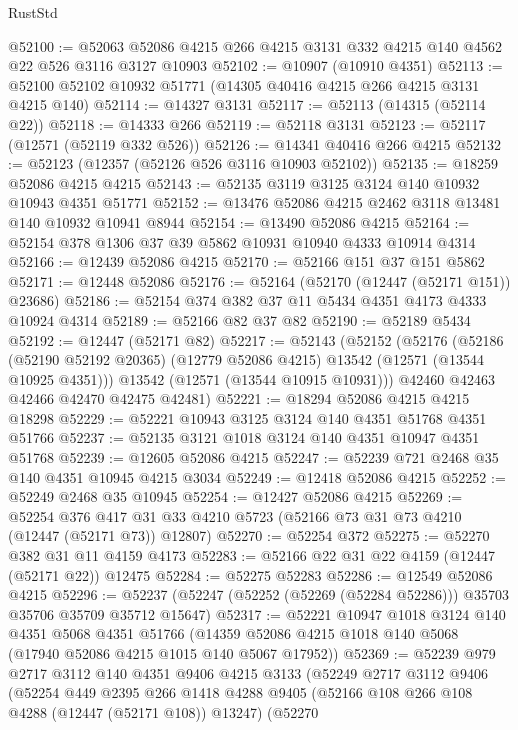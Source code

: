 \begin{lexlean}{RustStd}
\begin{coremodule}
@52100 := @52063 @52086 @4215 @266 @4215 @3131 @332 @4215 @140 @4562 @22 @526 @3116 @3127 @10903
@52102 := @10907 (@10910 @4351)
@52113 := @52100 @52102 @10932 @51771 (@14305 @40416 @4215 @266 @4215 @3131 @4215 @140)
@52114 := @14327 @3131
@52117 := @52113 (@14315 (@52114 @22))
@52118 := @14333 @266
@52119 := @52118 @3131
@52123 := @52117 (@12571 (@52119 @332 @526))
@52126 := @14341 @40416 @266 @4215
@52132 := @52123 (@12357 (@52126 @526 @3116 @10903 @52102))
@52135 := @18259 @52086 @4215 @4215
@52143 := @52135 @3119 @3125 @3124 @140 @10932 @10943 @4351 @51771
@52152 := @13476 @52086 @4215 @2462 @3118 @13481 @140 @10932 @10941 @8944
@52154 := @13490 @52086 @4215
@52164 := @52154 @378 @1306 @37 @39 @5862 @10931 @10940 @4333 @10914 @4314
@52166 := @12439 @52086 @4215
@52170 := @52166 @151 @37 @151 @5862
@52171 := @12448 @52086
@52176 := @52164 (@52170 (@12447 (@52171 @151)) @23686)
@52186 := @52154 @374 @382 @37 @11 @5434 @4351 @4173 @4333 @10924 @4314
@52189 := @52166 @82 @37 @82
@52190 := @52189 @5434
@52192 := @12447 (@52171 @82)
@52217 := @52143
    (@52152
      (@52176
        (@52186 (@52190 @52192 @20365) (@12779 @52086 @4215) @13542 (@12571 (@13544 @10925 @4351)))
        @13542
        (@12571 (@13544 @10915 @10931)))
      @42460
      @42463
      @42466
      @42470
      @42475
      @42481)
@52221 := @18294 @52086 @4215 @4215 @18298
@52229 := @52221 @10943 @3125 @3124 @140 @4351 @51768 @4351 @51766
@52237 := @52135 @3121 @1018 @3124 @140 @4351 @10947 @4351 @51768
@52239 := @12605 @52086 @4215
@52247 := @52239 @721 @2468 @35 @140 @4351 @10945 @4215 @3034
@52249 := @12418 @52086 @4215
@52252 := @52249 @2468 @35 @10945
@52254 := @12427 @52086 @4215
@52269 := @52254
    @376
    @417
    @31
    @33
    @4210
    @5723
    (@52166 @73 @31 @73 @4210 (@12447 (@52171 @73)) @12807)
@52270 := @52254 @372
@52275 := @52270 @382 @31 @11 @4159 @4173
@52283 := @52166 @22 @31 @22 @4159 (@12447 (@52171 @22)) @12475
@52284 := @52275 @52283
@52286 := @12549 @52086 @4215
@52296 := @52237 (@52247 (@52252 (@52269 (@52284 @52286))) @35703 @35706 @35709 @35712 @15647)
@52317 := @52221
    @10947
    @1018
    @3124
    @140
    @4351
    @5068
    @4351
    @51766
    (@14359 @52086 @4215 @1018 @140 @5068 (@17940 @52086 @4215 @1015 @140 @5067 @17952))
@52369 := @52239
    @979
    @2717
    @3112
    @140
    @4351
    @9406
    @4215
    @3133
    (@52249
      @2717
      @3112
      @9406
      (@52254
        @449
        @2395
        @266
        @1418
        @4288
        @9405
        (@52166 @108 @266 @108 @4288 (@12447 (@52171 @108)) @13247)
        (@52270

\end{coremodule}
\end{lexlean}
